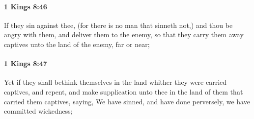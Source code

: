 		\paragraph{1 Kings 8:46} %
			\label{1KINGS-8-46}

			If they sin against thee, (for there is no man that sinneth not,) and thou be angry with them, and deliver them to the enemy, so that they carry them away captives unto the land of the enemy, far or near;


		\paragraph{1 Kings 8:47} %
			\label{1KINGS-8-47}

			Yet if they shall bethink themselves in the land whither they were carried captives, and repent, and make supplication unto thee in the land of them that carried them captives, saying, We have sinned, and have done perversely, we have committed wickedness;

